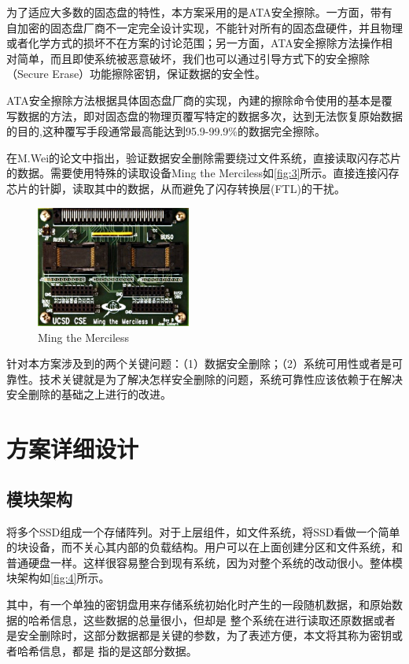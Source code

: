 为了适应大多数的固态盘的特性，本方案采用的是ATA安全擦除。一方面，带有自加密的固态盘厂商不一定完全设计实现，不能针对所有的固态盘硬件，并且物理或者化学方式的损坏不在方案的讨论范围；另一方面，ATA安全擦除方法操作相对简单，而且即使系统被恶意破坏，我们也可以通过引导方式下的安全擦除（Secure Erase）功能擦除密钥，保证数据的安全性。


ATA安全擦除方法根据具体固态盘厂商的实现，內建的擦除命令使用的基本是覆写数据的方法，即对固态盘的物理页覆写特定的数据多次，达到无法恢复原始数据的目的,这种覆写手段通常最高能达到95.9-99.9\%的数据完全擦除\cite{Wei2011Reliably}。


在M.Wei的论文\cite{Wei2011Reliably}中指出，验证数据安全删除需要绕过文件系统，直接读取闪存芯片的数据。需要使用特殊的读取设备Ming the Merciless如\autoref{fig:3}所示。直接连接闪存芯片的针脚，读取其中的数据，从而避免了闪存转换层(FTL)的干扰。
\begin{figure}[H]
	\centering
	\includegraphics[width=2in]{Pics/ming.png}
	\caption{Ming the Merciless}
    \label{fig:3}
\end{figure}
针对本方案涉及到的两个关键问题：（1）数据安全删除；（2）系统可用性或者是可靠性。技术关键就是为了解决怎样安全删除的问题，系统可靠性应该依赖于在解决安全删除的基础之上进行的改进。
\section{方案详细设计}
\subsection{模块架构}
将多个SSD组成一个存储阵列。对于上层组件，如文件系统，将SSD看做一个简单的块设备，而不关心其内部的负载结构。用户可以在上面创建分区和文件系统，和普通硬盘一样。这样很容易整合到现有系统，因为对整个系统的改动很小。整体模块架构如\autoref{fig:4}所示。


其中，有一个单独的密钥盘用来存储系统初始化时产生的一段随机数据，和原始数据的哈希信息，这些数据的总量很小，但却是
整个系统在进行读取还原数据或者是安全删除时，这部分数据都是关键的参数，为了表述方便，本文将其称为密钥或者哈希信息，都是
指的是这部分数据。


